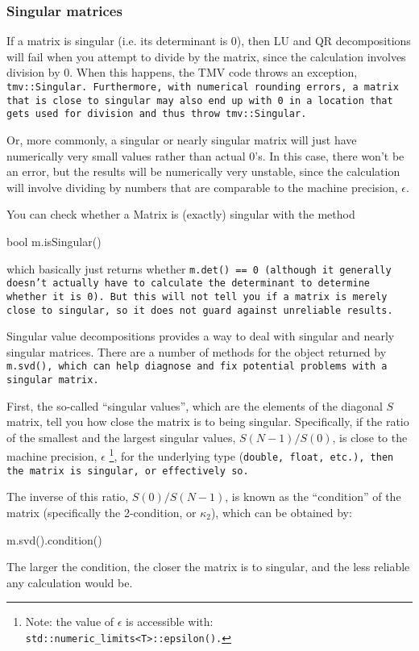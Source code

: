 \subsubsection{Singular matrices}
\label{Matrix_Division_Singular}

If a matrix is singular (i.e. its determinant is 0), 
then LU and QR decompositions
will fail when you attempt to divide by the matrix, since the 
calculation involves division by 0.  When this happens, the TMV code
throws an exception,
\tt{tmv::Singular}. 
Furthermore, with numerical rounding errors, a matrix
that is close to singular may also end up with 0 in a location that gets
used for division and thus throw \tt{tmv::Singular}.

Or, more commonly, a singular or nearly singular matrix
will just have numerically very small values rather than actual 0's.  In this 
case, there won't be an error, but the results will be numerically
very unstable, since the calculation will involve dividing by numbers
that are comparable to the machine precision, $\epsilon$.

You can check whether a Matrix is (exactly) singular with 
the method
\begin{tmvcode}
bool m.isSingular()
\end{tmvcode}
which basically just returns whether \tt{m.det() == 0} (although it generally doesn't actually have to calculate the determinant to determine whether it is 0).  But this will not
tell you if a matrix is merely close to singular, so it does not guard 
against unreliable results.

Singular value decompositions provides a way to deal with 
singular and nearly singular matrices.  There are a number of methods for the 
object returned by \tt{m.svd()}, which can help diagnose and fix 
potential problems with a singular matrix.

First, the so-called ``singular values'', which are the elements of the
diagonal $S$ matrix, tell you how close the matrix is to being singular.
Specifically, if the ratio of the smallest and the largest singular values,
$S(N-1)/S(0)$, is close to the machine precision, $\epsilon$
\footnote{Note: the value of $\epsilon$ is accessible with:
\tt{std::numeric_limits<T>::epsilon()}.}, for the 
underlying type (\tt{double}, \tt{float}, etc.),
then the matrix is singular, or effectively so.

The inverse of this ratio, $S(0)/S(N-1)$, is known as the ``condition'' of the matrix
(specifically the 2-condition, or $\kappa_2$), which can be obtained by:
\begin{tmvcode}
m.svd().condition()
\end{tmvcode}
The larger the condition, the closer the matrix is to singular, and the
less reliable any calculation would be.

